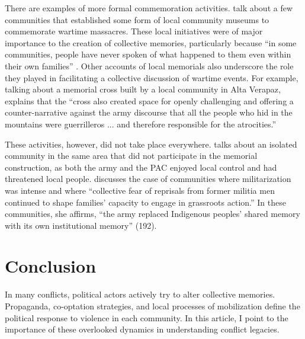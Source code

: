 \documentclass[12pt, notitlepage]{article}
\begin{document}
There are examples of more formal commemoration activities.
\citet{Arriaza:2008wf} talk about a few communities that established some form of local community museums to commemorate wartime massacres.
These local initiatives were of major importance to the creation of collective memories, particularly because ``in some communities, people have never spoken of what happened to them even within their own families'' \citep[161]{Arriaza:2008wf}.
Other accounts of local memorials also underscore the role they played in facilitating a collective discussion of wartime events.
For example, talking about a memorial cross built by a local community in Alta Verapaz, \citet[170--171]{Viaene:2011td} explains that the ``cross also created space for openly challenging and offering a counter-narrative against the army discourse that all the people who hid in the mountains were guerrilleros ... and therefore responsible for the atrocities.''

These activities, however, did not take place everywhere.
\citet{Viaene:2011td} talks about an isolated community in the same area that did not participate in the memorial construction, as both the army and the PAC enjoyed local control and had threatened local people.
\citet[178]{Esparza:2018uw} discusses the case of communities where militarization was intense and where ``collective fear of reprisals from former militia men continued to shape families' capacity to engage in grassroots action.'' In these communities, she affirms, ``the army replaced Indigenous peoples' shared memory with its own institutional memory'' (192).


\section*{Conclusion}

In many conflicts, political actors actively try to alter collective memories.
Propaganda, co-optation strategies, and local processes of mobilization define the political response to violence in each community.
In this article, I point to the importance of these overlooked dynamics in understanding conflict legacies.
\end{document}
